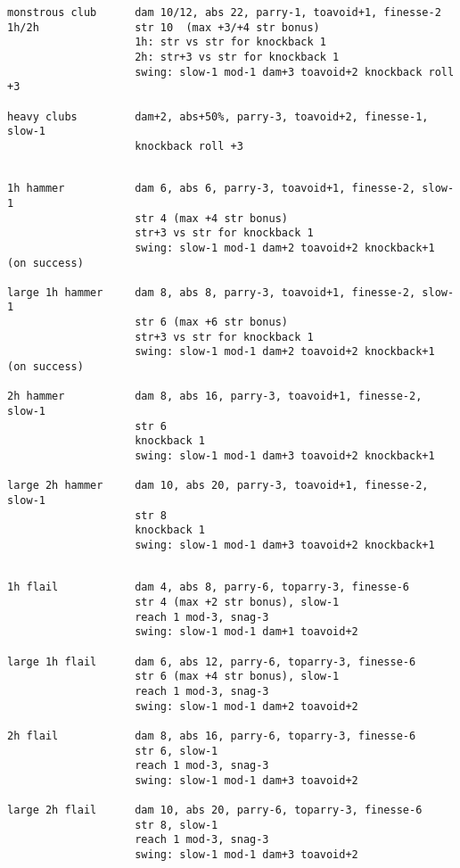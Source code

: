 \begin{verbatim}
monstrous club      dam 10/12, abs 22, parry-1, toavoid+1, finesse-2
1h/2h               str 10  (max +3/+4 str bonus)
                    1h: str vs str for knockback 1
                    2h: str+3 vs str for knockback 1
                    swing: slow-1 mod-1 dam+3 toavoid+2 knockback roll +3

heavy clubs         dam+2, abs+50%, parry-3, toavoid+2, finesse-1, slow-1
                    knockback roll +3


\end{verbatim} \pagebreak[1] \begin{verbatim}
1h hammer           dam 6, abs 6, parry-3, toavoid+1, finesse-2, slow-1
                    str 4 (max +4 str bonus)
                    str+3 vs str for knockback 1
                    swing: slow-1 mod-1 dam+2 toavoid+2 knockback+1 (on success)

large 1h hammer     dam 8, abs 8, parry-3, toavoid+1, finesse-2, slow-1
                    str 6 (max +6 str bonus)
                    str+3 vs str for knockback 1
                    swing: slow-1 mod-1 dam+2 toavoid+2 knockback+1 (on success)

2h hammer           dam 8, abs 16, parry-3, toavoid+1, finesse-2, slow-1
                    str 6
                    knockback 1
                    swing: slow-1 mod-1 dam+3 toavoid+2 knockback+1

large 2h hammer     dam 10, abs 20, parry-3, toavoid+1, finesse-2, slow-1
                    str 8
                    knockback 1
                    swing: slow-1 mod-1 dam+3 toavoid+2 knockback+1


\end{verbatim} \pagebreak[1] \begin{verbatim}
1h flail            dam 4, abs 8, parry-6, toparry-3, finesse-6
                    str 4 (max +2 str bonus), slow-1
                    reach 1 mod-3, snag-3
                    swing: slow-1 mod-1 dam+1 toavoid+2

large 1h flail      dam 6, abs 12, parry-6, toparry-3, finesse-6
                    str 6 (max +4 str bonus), slow-1
                    reach 1 mod-3, snag-3
                    swing: slow-1 mod-1 dam+2 toavoid+2

2h flail            dam 8, abs 16, parry-6, toparry-3, finesse-6
                    str 6, slow-1
                    reach 1 mod-3, snag-3
                    swing: slow-1 mod-1 dam+3 toavoid+2

large 2h flail      dam 10, abs 20, parry-6, toparry-3, finesse-6
                    str 8, slow-1
                    reach 1 mod-3, snag-3
                    swing: slow-1 mod-1 dam+3 toavoid+2



\end{verbatim}
